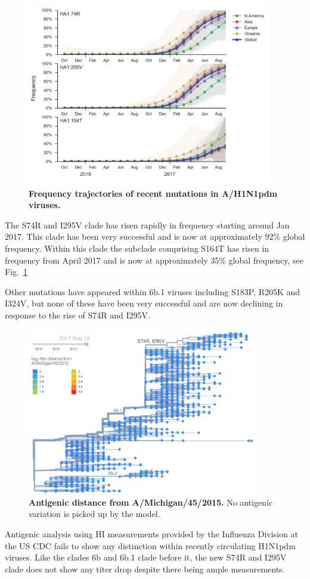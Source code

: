 \documentclass[11pt,oneside,letterpaper]{article}
\newcommand{\FIG}[1]{Fig.~\ref{#1}}
\begin{document}
\begin{figure}[H]
  \centering
  \includegraphics[width=0.95\textwidth]{../figures/sep-2017/h1n1pdm_mutations.png}
  \caption{\textbf{Frequency trajectories of recent mutations in A/H1N1pdm viruses.}  }
  \label{H1N1pdm_clades}
\end{figure}

The S74R and I295V clade has risen rapidly in frequency starting around
Jan 2017. This clade has been very successful and is now at
approximately 92\% global frequency. Within this clade the subclade
comprising S164T has risen in frequency from April 2017 and is now at
approximately 35\% global frequency, see \FIG{H1N1pdm_clades}

Other mutations have appeared within 6b.1 viruses including S183P, R205K
and I324V, but none of these have been very successful and are now
declining in response to the rise of S74R and I295V.

\clearpage
\begin{figure}[H]
  \centering
  \includegraphics[width=0.9\textwidth]{../figures/sep-2017/h1n1pdm_tree_titer_model.png}
  \caption{\textbf{Antigenic distance from A/Michigan/45/2015.} No antigenic variation is picked up by the model.
  }
  \label{H1N1pdm_mutations}
\end{figure}
Antigenic analysis using HI measurements provided by the Influenza
Division at the US CDC fails to show any distinction within recently
circulating H1N1pdm viruses. Like the clades 6b and 6b.1 clade before
it, the new S74R and I295V clade does not show any titer drop despite
there being ample measurements.
\end{document}
